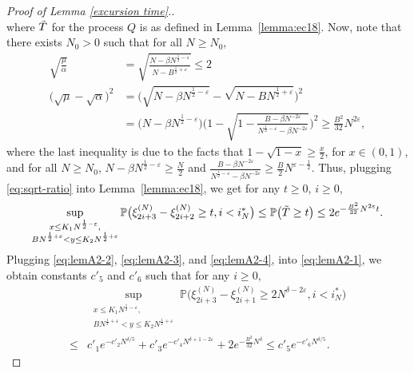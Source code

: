 \documentclass[11pt, reqno]{article}
\numberwithin{equation}{section}
\numberwithin{theorem}{section}
\begin{document}
\begin{appendix}
\begin{proof}[Proof of Lemma \ref{excursion time}.]
\begin{equation}
\end{equation}
where $\Tilde{T}$ for the process $Q$ is as defined in Lemma~\ref{lemma:ec18}. Now, note that there exists $N_0>0$ such that for all $N\geq N_0$,
\begin{equation}\label{eq:sqrt-ratio}
\begin{split}
     \sqrt{\frac{\mu}{\alpha}}&=\sqrt{\frac{N-\beta N^{\frac{1}{2}-\varepsilon}}{N-B^{\frac{1}{2}+\varepsilon}}}\leq 2\\
     \big(\sqrt{\mu}-\sqrt{\alpha}\big)^2&=\big(\sqrt{N-\beta N^{\frac{1}{2}-\varepsilon}}-\sqrt{N-BN^{\frac{1}{2}+\varepsilon}}\big)^2\\
    &= \big(N-\beta N^{\frac{1}{2}-\varepsilon}\big)\Big(1-\sqrt{1-\frac{B-\beta N^{-2\varepsilon}}{N^{\frac{1}{2}-\varepsilon}-\beta N^{-2\varepsilon}}}\Big)^2
    \geq \frac{B^2}{32} N^{2\varepsilon},
\end{split}
\end{equation}
where the last inequality is due to the facts that $1-\sqrt{1-x}\geq \frac{x}{2}$, for $x\in(0,1)$, and for all $N\geq N_0$, 
$N-\beta N^{\frac{1}{2}-\varepsilon} \geq \frac{N}{2}$ and $\frac{B-\beta N^{-2\varepsilon}}{N^{\frac{1}{2}-\varepsilon}-\beta N^{-2\varepsilon}}\geq \frac{B}{2}N^{\varepsilon-\frac{1}{2}}$. 
Thus, plugging \eqref{eq:sqrt-ratio} into Lemma~\ref{lemma:ec18}, we get for any $t \ge 0$, $i \ge 0$,
\begin{equation}\label{eq:lemA2-4}
    \sup_{\substack{x\leq K_1N^{\frac{1}{2} - \varepsilon},\\ BN^{\frac{1}{2} + \varepsilon} <y\leq K_2N^{\frac{1}{2} + \varepsilon}}}\mathbb{P}\big(\xi^{(N)}_{2i+3}-\xi^{(N)}_{2i+2}\geq t,  i <i^*_N\big)
 \leq \mathbb{P}\big(\Tilde{T}\geq t\big)
 \leq 2e^{-\frac{B^2}{32} N^{2\varepsilon}t}.
\end{equation}
Plugging \eqref{eq:lemA2-2}, \eqref{eq:lemA2-3}, and \eqref{eq:lemA2-4}, into \eqref{eq:lemA2-1}, we obtain constants $c'_5$ and $c'_6$ such that for any $i \ge 0$,
\begin{align}\label{eq:lemA2-5}
    &\sup_{\substack{x\leq K_1N^{\frac{1}{2} - \varepsilon},\\ BN^{\frac{1}{2} + \varepsilon} <y\leq K_2N^{\frac{1}{2} + \varepsilon}}}\mathbb{P}\Big(\xi^{(N)}_{2i+3}-\xi^{(N)}_{2i+1}\geq 2N^{\delta-2\varepsilon}, i <i^*_N\Big)\nonumber\\
   \leq & c'_1e^{-c'_2N^{\delta/5}}+c'_3e^{-c'_4N^{\delta + 1 - 2\varepsilon}}+2e^{-\frac{B^2}{32} N^{\delta}}\leq c'_5e^{-c'_6N^{\delta/5}}.
\end{align}

\end{proof}
\end{appendix}
\end{document}
